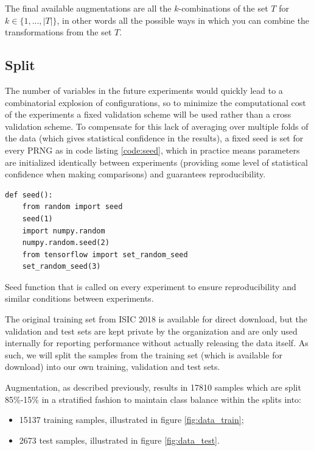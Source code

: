 The final available augmentations are all the $k$-combinations of the set $T$ for $k \in \{1, ..., |T|\}$, in other words all the possible ways in which you can combine the transformations from the set $T$.

\subsection{Split}

The number of variables in the future experiments would quickly lead to a combinatorial explosion of configurations, so to minimize the computational cost of the experiments a fixed validation scheme will be used rather than a cross validation scheme. To compensate for this lack of averaging over multiple folds of the data (which gives statistical confidence in the results), a fixed seed is set for every \ac{PRNG} as in code listing \ref{code:seed}, which in practice means parameters are initialized identically between experiments (providing some level of statistical confidence when making comparisons) and guarantees reproducibility.

\begin{listing}[ht]
\begin{verbatim}
def seed():
    from random import seed
    seed(1)
    import numpy.random
    numpy.random.seed(2)
    from tensorflow import set_random_seed
    set_random_seed(3)
\end{verbatim}
\caption{Seed function that is called on every experiment to ensure reproducibility and similar conditions between experiments.}
\label{code:seed}
\end{listing}

The original training set from ISIC 2018 is available for direct download, but the validation and test sets are kept private by the organization and are only used internally for reporting performance without actually releasing the data itself. As such, we will split the samples from the training set (which is available for download) into our own training, validation and test sets.

Augmentation, as described previously, results in 17810 samples which are split 85\%-15\% in a stratified fashion to maintain class balance within the splits into:

\begin{itemize}
    \item 15137 training samples, illustrated in figure \ref{fig:data_train};
    \item 2673 test samples, illustrated in figure \ref{fig:data_test}.
\end{itemize}

